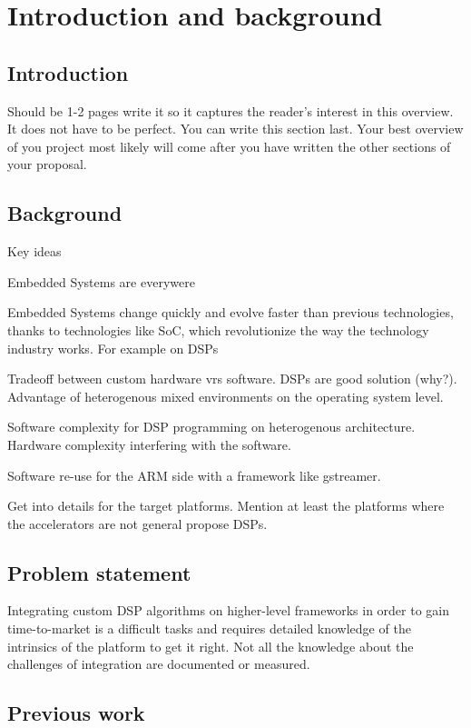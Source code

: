 \chapter{Introduction and background}

\section{Introduction}
Should be 1-2 pages
write it so it captures the reader's interest in this overview. It does not have to be perfect.
You can write this section last. Your best overview of you project most likely will come after you have written the other sections of your proposal.

\section{Background}
Key ideas

Embedded Systems are everywere

Embedded Systems change quickly and evolve faster than previous technologies, thanks to technologies like \ac{SoC}, which revolutionize the way the technology industry works\cite{Somaya:2000fk}. For example on \acp{DSP}

Tradeoff between custom hardware vrs software. \acp{DSP} are good solution (why?). Advantage of heterogenous mixed environments on the operating system level.

Software complexity for DSP programming on heterogenous architecture. Hardware complexity interfering with the software.

Software re-use for the ARM side with a framework like gstreamer.

Get into details for the target platforms. Mention at least the platforms where the accelerators are not general propose \acp{DSP}.

\section{Problem statement}
Integrating custom DSP algorithms on higher-level frameworks in order to gain time-to-market is a difficult tasks and requires detailed knowledge of the intrinsics of the platform to get it right. Not all the knowledge about the challenges of integration are documented or measured.

\section{Previous work}

